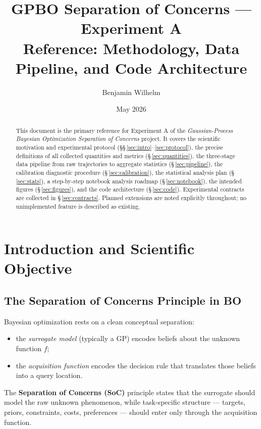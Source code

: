 \documentclass[11pt]{article}
\title{%
  \textbf{GPBO Separation of Concerns --- Experiment A}\\[0.4em]
  \large Reference: Methodology, Data Pipeline, and Code Architecture
}
\author{Benjamin Wilhelm}
\date{May 2026}
\begin{document}
 
\maketitle
 
\begin{abstract}
This document is the primary reference for Experiment A of the
\emph{Gaussian-Process Bayesian Optimization Separation of Concerns} project.
It covers the scientific motivation and experimental protocol (\S\S\,\ref{sec:intro}--\ref{sec:protocol}),
the precise definitions of all collected quantities and metrics (\S\,\ref{sec:quantities}),
the three-stage data pipeline from raw trajectories to aggregate statistics (\S\,\ref{sec:pipeline}),
the calibration diagnostic procedure (\S\,\ref{sec:calibration}),
the statistical analysis plan (\S\,\ref{sec:stats}),
a step-by-step notebook analysis roadmap (\S\,\ref{sec:notebook}),
the intended figures (\S\,\ref{sec:figures}),
and the code architecture (\S\,\ref{sec:code}).
Experimental contracts are collected in \S\,\ref{sec:contracts}.
Planned extensions are noted explicitly throughout; no unimplemented feature is described
as existing.
\end{abstract}
 
\tableofcontents
\clearpage
 
\section{Introduction and Scientific Objective}
\label{sec:intro}
 
\subsection{The Separation of Concerns Principle in BO}
 
Bayesian optimization rests on a clean conceptual separation:
\begin{itemize}
  \item the \emph{surrogate model} (typically a GP) encodes beliefs about the
        unknown function $f$;
  \item the \emph{acquisition function} encodes the decision rule that translates
        those beliefs into a query location.
\end{itemize}
The \textbf{Separation of Concerns (SoC)} principle states that the surrogate should
model the raw unknown phenomenon, while task-specific structure --- targets, priors,
constraints, costs, preferences --- should enter only through the acquisition function.
 
\end{document}
